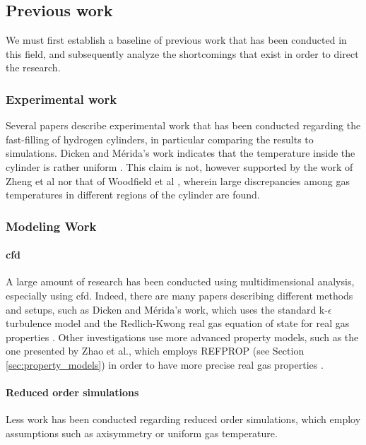 \subsection{Previous work}

We must first establish a baseline of previous work that has been conducted in this field, and subsequently analyze the shortcomings that exist in order to direct the research.


\subsubsection{Experimental work}
\label{sec:experimental_work}
Several papers describe experimental work that has been conducted regarding the fast-filling of hydrogen cylinders, in particular comparing the results to simulations. Dicken and M\'erida's work indicates that the temperature inside the cylinder is rather uniform \cite{Dicken2007}. This claim is not, however supported by the work of Zheng et al \cite{Zheng2013} nor that of Woodfield et al \cite{Woodfield2008}, wherein large discrepancies among gas temperatures in different regions of the cylinder are found.


\subsubsection{Modeling Work}
\label{sec:modelingWork}

\paragraph{\gls{cfd}}
A large amount of research has been conducted using multidimensional analysis, especially using \gls{cfd}. Indeed, there are many papers describing different methods and setups, such as Dicken and M\'erida's work, which uses the standard  k-$\epsilon$ turbulence model and the Redlich-Kwong real gas equation of state for real gas properties \cite{Dicken2007a}. 
Other investigations use more advanced property models, such as the one presented by Zhao et al., which employs REFPROP (see Section \ref{sec:property_models}) in order to have more precise real gas properties \cite{Zhao2012}.

\paragraph{Reduced order simulations}
Less work has been conducted regarding reduced order simulations, which employ assumptions such as axisymmetry or uniform gas temperature. 

